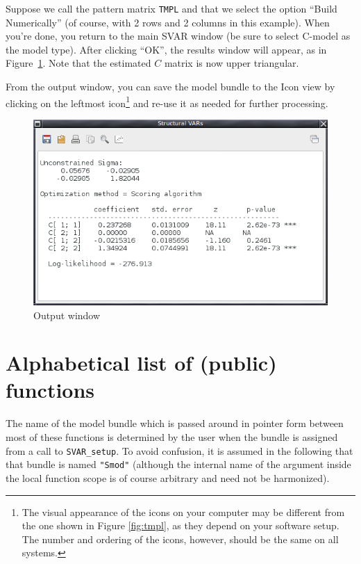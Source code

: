 \documentclass[a4paper,10pt]{article}
\begin{document}
Suppose we call the pattern matrix \texttt{TMPL} and that we select
the option ``Build Numerically'' (of course, with 2 rows and 2 columns
in this example).  When you're done, you return to the main SVAR
window (be sure to select C-model as the model type). After clicking
``OK'', the results window will appear, as in
Figure~\ref{fig:GUI-output}. Note that the estimated $C$ matrix is now
upper triangular.

From the output window, you can save the model bundle to the Icon view
by clicking on the leftmost icon\footnote{The visual appearance of the
  icons on your computer may be different from the one shown in Figure
  \ref{fig:tmpl}, as they depend on your software setup.  The number
  and ordering of the icons, however, should be the same on all
  systems.} and re-use it as needed for further processing.
\begin{figure}[htbp]
  \centering
  \includegraphics[scale=0.5]{Output.png}
  \caption{Output window}
  \label{fig:GUI-output}
\end{figure}

\clearpage

\section{Alphabetical list of (public) functions}
\label{sec:syntax}

The name of the model bundle which is passed around in pointer form between 
most of these functions is determined by the user when the bundle is assigned
from a call to \texttt{SVAR\_setup}. To avoid confusion, it is assumed in the
following that that bundle is named \texttt{"Smod"} (although the internal 
name of the argument inside the local function scope is of course arbitrary 
and need not be harmonized). 
\end{document}
